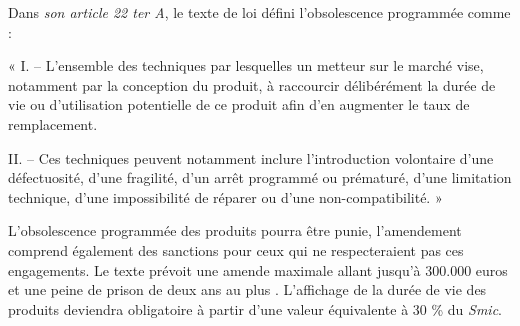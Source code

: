 \smallbreak
Dans \textit{son article 22 ter A}, le texte de loi défini l’obsolescence programmée comme :

\begin{itshape}« I. – L’ensemble des techniques par lesquelles un metteur sur le marché vise, notamment par la conception du produit, à raccourcir délibérément la durée de vie ou d’utilisation potentielle de ce produit afin d’en augmenter le taux de remplacement.

II. – Ces techniques peuvent notamment inclure l’introduction volontaire d’une défectuosité, d’une fragilité, d’un arrêt programmé ou prématuré, d’une limitation technique, d’une impossibilité de réparer ou d’une non-compatibilité. »
\end{itshape}

\smallbreak
L’obsolescence programmée des produits pourra être punie, l’amendement comprend également des sanctions pour ceux qui ne respecteraient pas ces engagements. Le texte prévoit une amende maximale allant jusqu'à 300.000 euros et une peine de prison de deux ans au plus \cite{sanctionloi}. L'affichage de la durée de vie des produits deviendra obligatoire à partir d'une valeur équivalente à 30 \% du \textit{Smic}.